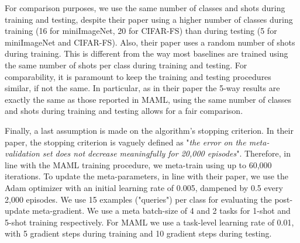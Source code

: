 For comparison purposes, we use the same number of classes and shots during training and testing, despite their paper using a higher number of classes during training (16 for miniImageNet, 20 for \textsc{CIFAR-FS}) than during testing (5 for miniImageNet and \textsc{CIFAR-FS}). Also, their paper uses a random number of shots during training. This is different from the way most baselines are trained using the same number of shots per class during training and testing\supercite{MAML,reptile,vinyals}. For comparability, it is paramount to keep the training and testing procedures similar, if not the same. In particular, as in their paper the 5-way results are exactly the same as those reported in MAML\supercite{finn}, using the same number of classes and shots during training and testing allows for a fair comparison.


Finally, a last assumption is made on the algorithm's stopping criterion. In their paper, the stopping criterion is vaguely defined as "\textit{the error on the meta-validation set does not decrease meaningfully for 20,000 episodes}". Therefore, in line with the MAML training procedure, we meta-train using up to 60,000 iterations. To update the meta-parameters, in line with their paper, we use the Adam optimizer\supercite{adam} with an initial learning rate of 0.005, dampened by 0.5 every 2,000 episodes. We use 15 examples ("queries") per class for evaluating the post-update meta-gradient. We use a meta batch-size of 4 and 2 tasks for 1-shot and 5-shot training respectively. For MAML we use a task-level learning rate of 0.01, with 5 gradient steps during training and 10 gradient steps during testing.


